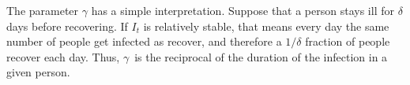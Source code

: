 The parameter $\gamma$ has a simple interpretation. Suppose that a person
stays ill for $\delta$ days before recovering.
If $I_t$ is relatively stable, that means every day the same number of people
get infected as recover, and therefore a $1/\delta$ fraction of people
recover each day. Thus, $\gamma$~is the reciprocal of the duration of the infection
in a given person.

\endinput

\begin{exercise}
  You can make the model more realistic by letting vaccination be
  only partly effective. For instance, 50\% of people got the flu
  vaccine, but it was only 40\% effective; 90\%~of people have the
  measles vaccine, and it is about 97\%
  effective. (\url{https://www.cdc.gov/nchs/fastats/immunize.htm}) How
  does your model function in this case? Keep in mind that different
  diseases have different degrees of infectiousness
  (\url{https://en.wikipedia.org/wiki/Basic_reproduction_number}).
\end{exercise}
